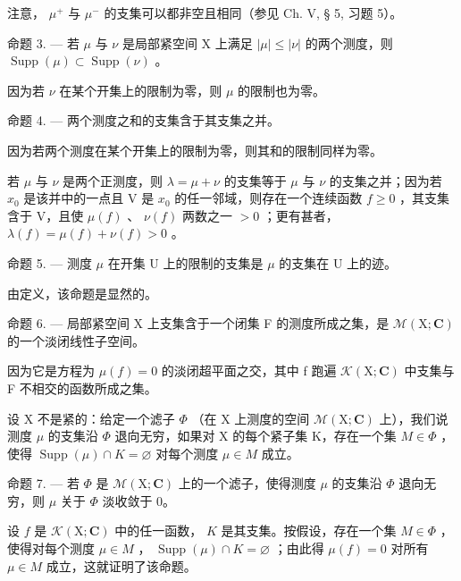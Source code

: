 注意， \(\mu^{+}\) 与 \(\mu^{-}\) 的支集可以都非空且相同（参见 Ch. V, § 5, 习题 5）。

命题 3. --- 若 \(\mu\) 与 \(\nu\) 是局部紧空间 X 上满足 \(|\mu| \leqslant |\nu|\) 的两个测度，则 \(\operatorname{Supp}(\mu) \subset \operatorname{Supp}(\nu)\) 。

因为若 \(\nu\) 在某个开集上的限制为零，则 \(\mu\) 的限制也为零。

命题 4. --- 两个测度之和的支集含于其支集之并。

因为若两个测度在某个开集上的限制为零，则其和的限制同样为零。

若 \(\mu\) 与 \(\nu\) 是两个正测度，则 \(\lambda = \mu + \nu\) 的支集等于 \(\mu\) 与 \(\nu\) 的支集之并；因为若 \(x_0\) 是该并中的一点且 V 是 \(x_0\) 的任一邻域，则存在一个连续函数 \(f \geqslant 0\) ，其支集含于 V，且使 \(\mu(f)\) 、 \(\nu(f)\) 两数之一 \(>0\) ；更有甚者， \(\lambda(f) = \mu(f) + \nu(f) > 0\) 。

命题 5. --- 测度 \(\mu\) 在开集 U 上的限制的支集是 \(\mu\) 的支集在 U 上的迹。

由定义，该命题是显然的。

命题 6. --- 局部紧空间 X 上支集含于一个闭集 F 的测度所成之集，是 \(\mathcal{M}(\mathrm{X};\mathbf{C})\) 的一个淡闭线性子空间。

因为它是方程为 \(\mu(f) = 0\) 的淡闭超平面之交，其中 f 跑遍 \(\mathcal{K}(\mathrm{X};\mathbf{C})\) 中支集与 F 不相交的函数所成之集。

设 X 不是紧的：给定一个滤子 \(\Phi\) （在 X 上测度的空间 \(\mathcal{M}(\mathrm{X};\mathbf{C})\) 上），我们说测度 \(\mu\) 的支集沿 \(\Phi\) 退向无穷，如果对 X 的每个紧子集 K，存在一个集 \(M\in\Phi\) ，使得 \(\operatorname{Supp}(\mu)\cap K=\varnothing\) 对每个测度 \(\mu\in M\) 成立。

命题 7. --- 若 \(\Phi\) 是 \(\mathcal{M}(\mathrm{X};\mathbf{C})\) 上的一个滤子，使得测度 \(\mu\) 的支集沿 \(\Phi\) 退向无穷，则 \(\mu\) 关于 \(\Phi\) 淡收敛于 0。

设 \(f\) 是 \(\mathcal{K}(\mathrm{X};\mathbf{C})\) 中的任一函数， \(K\) 是其支集。按假设，存在一个集 \(M \in \Phi\) ，使得对每个测度 \(\mu \in M\) ， \(\operatorname{Supp}(\mu) \cap K = \varnothing\) ；由此得 \(\mu(f) = 0\) 对所有 \(\mu \in M\) 成立，这就证明了该命题。

